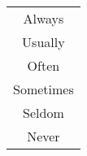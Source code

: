 \documentclass[all-cards.tex]{subfiles}
\begin{document}
		{
			\begin{tabular}{c}
				Always \\
				Usually \\
				Often \\
				Sometimes \\
				Seldom \\
				Never \\
			\end{tabular}
		}
\end{document}
